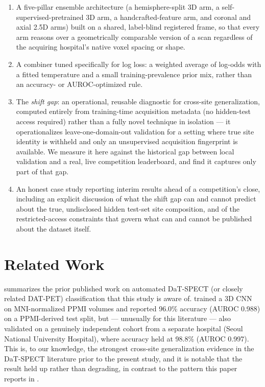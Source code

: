 \documentclass[10pt]{article}
\begin{document}
\begin{enumerate}[leftmargin=*]
\item A five-pillar ensemble architecture (a hemisphere-split 3D arm, a self-supervised-pretrained 3D arm, a handcrafted-feature arm, and coronal and axial 2.5D arms) built on a shared, label-blind registered frame, so that every arm reasons over a geometrically comparable version of a scan regardless of the acquiring hospital's native voxel spacing or shape.
\item A combiner tuned specifically for log loss: a weighted average of log-odds with a fitted temperature and a small training-prevalence prior mix, rather than an accuracy- or AUROC-optimized rule.
\item The \emph{shift gap}: an operational, reusable diagnostic for cross-site generalization, computed entirely from training-time acquisition metadata (no hidden-test access required) rather than a fully novel technique in isolation --- it operationalizes leave-one-domain-out validation for a setting where true site identity is withheld and only an unsupervised acquisition fingerprint is available. We measure it here against the historical gap between local validation and a real, live competition leaderboard, and find it captures only part of that gap.
\item An honest case study reporting interim results ahead of a competition's close, including an explicit discussion of what the shift gap can and cannot predict about the true, undisclosed hidden test-set site composition, and of the restricted-access constraints that govern what can and cannot be published about the dataset itself.
\end{enumerate}

\section{Related Work}
\label{sec:related}

 summarizes the prior published work on automated DaT-SPECT (or closely related DAT-PET) classification that this study is aware of. \citet{choi2017} trained a 3D CNN on MNI-normalized PPMI volumes and reported 96.0\% accuracy (AUROC 0.988) on a PPMI-derived test split, but --- unusually for this literature --- also validated on a genuinely independent cohort from a separate hospital (Seoul National University Hospital), where accuracy held at 98.8\% (AUROC 0.997). This is, to our knowledge, the strongest cross-site generalization evidence in the DaT-SPECT literature prior to the present study, and it is notable that the result held up rather than degrading, in contrast to the pattern this paper reports in .
\end{document}
